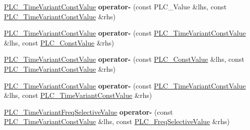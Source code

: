 \begin{DoxyCompactItemize}
\item 
\hypertarget{classns3_1_1PLC__TimeVariantConstValue_a28d3fed98af25f9a7064647f55fde144}{\hyperlink{classns3_1_1PLC__TimeVariantConstValue}{\-P\-L\-C\-\_\-\-Time\-Variant\-Const\-Value} {\bfseries operator-\/} (const \-P\-L\-C\-\_\-\-Value \&lhs, const \hyperlink{classns3_1_1PLC__TimeVariantConstValue}{\-P\-L\-C\-\_\-\-Time\-Variant\-Const\-Value} \&rhs)}\label{classns3_1_1PLC__TimeVariantConstValue_a28d3fed98af25f9a7064647f55fde144}

\item 
\hypertarget{classns3_1_1PLC__TimeVariantConstValue_aa267a4d5872e938dee63534c33abe219}{\hyperlink{classns3_1_1PLC__TimeVariantConstValue}{\-P\-L\-C\-\_\-\-Time\-Variant\-Const\-Value} {\bfseries operator-\/} (const \hyperlink{classns3_1_1PLC__TimeVariantConstValue}{\-P\-L\-C\-\_\-\-Time\-Variant\-Const\-Value} \&lhs, const \hyperlink{classns3_1_1PLC__ConstValue}{\-P\-L\-C\-\_\-\-Const\-Value} \&rhs)}\label{classns3_1_1PLC__TimeVariantConstValue_aa267a4d5872e938dee63534c33abe219}

\item 
\hypertarget{classns3_1_1PLC__TimeVariantConstValue_a45297ea4508e27d407fed4d5e4c8ce6a}{\hyperlink{classns3_1_1PLC__TimeVariantConstValue}{\-P\-L\-C\-\_\-\-Time\-Variant\-Const\-Value} {\bfseries operator-\/} (const \hyperlink{classns3_1_1PLC__ConstValue}{\-P\-L\-C\-\_\-\-Const\-Value} \&lhs, const \hyperlink{classns3_1_1PLC__TimeVariantConstValue}{\-P\-L\-C\-\_\-\-Time\-Variant\-Const\-Value} \&rhs)}\label{classns3_1_1PLC__TimeVariantConstValue_a45297ea4508e27d407fed4d5e4c8ce6a}

\item 
\hypertarget{classns3_1_1PLC__TimeVariantConstValue_a52b616ed32fd490a40c122f5c94bdd7d}{\hyperlink{classns3_1_1PLC__TimeVariantConstValue}{\-P\-L\-C\-\_\-\-Time\-Variant\-Const\-Value} {\bfseries operator-\/} (const \hyperlink{classns3_1_1PLC__TimeVariantConstValue}{\-P\-L\-C\-\_\-\-Time\-Variant\-Const\-Value} \&lhs, const \hyperlink{classns3_1_1PLC__TimeVariantConstValue}{\-P\-L\-C\-\_\-\-Time\-Variant\-Const\-Value} \&rhs)}\label{classns3_1_1PLC__TimeVariantConstValue_a52b616ed32fd490a40c122f5c94bdd7d}

\item 
\hypertarget{classns3_1_1PLC__TimeVariantConstValue_a67c677f135b0983559bc0ac2960e4976}{\hyperlink{classns3_1_1PLC__TimeVariantFreqSelectiveValue}{\-P\-L\-C\-\_\-\-Time\-Variant\-Freq\-Selective\-Value} {\bfseries operator-\/} (const \hyperlink{classns3_1_1PLC__TimeVariantConstValue}{\-P\-L\-C\-\_\-\-Time\-Variant\-Const\-Value} \&lhs, const \hyperlink{classns3_1_1PLC__FreqSelectiveValue}{\-P\-L\-C\-\_\-\-Freq\-Selective\-Value} \&rhs)}\label{classns3_1_1PLC__TimeVariantConstValue_a67c677f135b0983559bc0ac2960e4976}


\end{DoxyCompactItemize}
